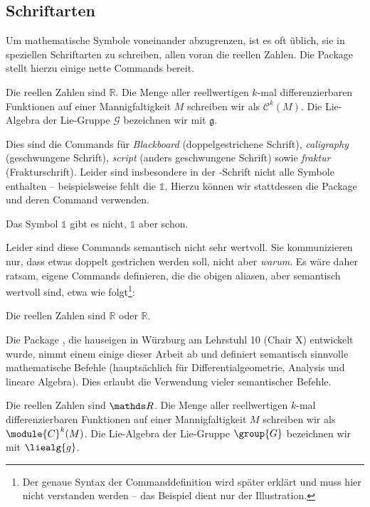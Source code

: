 \subsection{Schriftarten}
Um mathematische Symbole voneinander abzugrenzen, ist es oft üblich, sie in speziellen Schriftarten zu schreiben, allen voran die reellen Zahlen.
Die Package  stellt hierzu einige nette Commands bereit.
\begin{latexlisting}
    Die reellen Zahlen sind $\mathbb{R}$.
    Die Menge aller reellwertigen $k$-mal differenzierbaren Funktionen auf einer Mannigfaltigkeit $M$ schreiben wir als $\mathcal{C}^k(M)$.
    Die Lie-Algebra der Lie-Gruppe $\mathscr{G}$ bezeichnen wir mit $\mathfrak{g}$.
\end{latexlisting}
Dies sind die Commands für \emph{Blackboard} (doppelgestrichene Schrift), \emph{caligraphy} (geschwungene Schrift), \emph{script} (anders geschwungene Schrift) sowie \emph{fraktur} (Frakturschrift).
Leider sind insbesondere in der -Schrift nicht alle Symbole enthalten -- beispielsweise fehlt die $\mathds{1}$.
Hierzu können wir stattdessen die Package  und deren Command verwenden.
\begin{latexlisting}
	Das Symbol $\mathbb{1}$ gibt es nicht, $\mathds{1}$ aber schon.
\end{latexlisting}
Leider sind diese Commands semantisch nicht sehr wertvoll.
Sie kommunizieren nur, dass etwas doppelt gestrichen werden soll, nicht aber \emph{warum}.
Es wäre daher ratsam, eigene Commands definieren, die die obigen aliasen, aber semantisch wertvoll sind, etwa wie folgt\footnote{Der genaue Syntax der Commanddefinition wird später erklärt und muss hier nicht verstanden werden -- das Beispiel dient nur der Illustration.}:
\begin{latexlisting}
	\newcommand{\reals}{\mathds{R}}
	\newcommand{\field}[1]{\mathds{#1}}
	Die reellen Zahlen sind $\reals$ oder $\field{R}$.
\end{latexlisting}
Die Package , die hauseigen in Würzburg am Lehrstuhl 10 (Chair X) entwickelt wurde, nimmt einem einige dieser Arbeit ab und definiert semantisch sinnvolle mathematische Befehle (hauptsächlich für Differentialgeometrie, Analysis und lineare Algebra).
Dies erlaubt die Verwendung vieler semantischer Befehle.
\begin{latexlisting}
    Die reellen Zahlen sind $\field{R}$.
    Die Menge aller reellwertigen $k$-mal differenzierbaren Funktionen auf einer Mannigfaltigkeit $M$ schreiben wir als $\module{C}^k(M)$.
    Die Lie-Algebra der Lie-Gruppe $\group{G}$ bezeichnen wir mit $\liealg{g}$.
\end{latexlisting}

